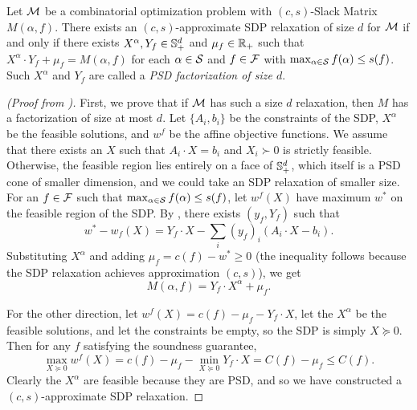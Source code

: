 \begin{theorem}\label{thm:yannakakis}
Let $\mathcal M$ be a combinatorial optimization problem with $(c,s)$-Slack Matrix $M(\alpha,f)$. There exists an $(c,s)$-approximate SDP relaxation of size $d$ for $\mathcal M$ if and only if there exists $X^\alpha,Y_f \in \mathbb{S}^{d}_+$ and $\mu_f \in \mathbb R_+$ such that $X^\alpha \cdot Y_f + \mu_f = M(\alpha,f)$ for each $\alpha \in \mathcal S $ and $f \in \mathcal F$ with $\max_{\alpha \in \mathcal S} f(\alpha) \leq s(f)$. Such $X^\alpha$ and $Y_f$ are called a \emph{PSD factorization of size $d$}.
\end{theorem}
\begin{proof}[(Proof from \cite{BPZ15})]
First, we prove that if $\mathcal M$ has such a size $d$ relaxation, then $M$ has a factorization of size at most $d$. Let $\{A_i, b_i\}$ be the constraints of the SDP, $X^\alpha$ be the feasible solutions, and $w^f$ be the affine objective functions. We assume that there exists an $X$ such that $A_i \cdot X = b_i$ and $X_i \succ 0$ is strictly feasible. Otherwise, the feasible region lies entirely on a face of $\mathbb{S}^{d}_+$, which itself is a PSD cone of smaller dimension, and we could take an SDP relaxation of smaller size. For an $f \in \mathcal F$ such that $\max_{\alpha \in \mathcal S} f(\alpha) \leq s(f)$, let $w^f(X)$ have maximum $w^*$ on the feasible region of the SDP. By , there exists $(y_f, Y_f)$ such that
\[w^* - w_f(X) = Y_f \cdot X - \sum_i (y_f)_i(A_i \cdot X - b_i).\]
Substituting $X^\alpha$ and adding $\mu_f = c(f) - w^* \geq 0$ (the inequality follows because the SDP relaxation achieves approximation $(c,s)$), we get
\[M(\alpha,f) = Y_f \cdot X^\alpha + \mu_f.\]

For the other direction, let $w^f(X) = c(f) - \mu_f - Y_f \cdot X$, let the $X^\alpha$ be the feasible solutions, and let the constraints be empty, so the SDP is simply $X \succeq 0$. Then for any $f$ satisfying the soundness guarantee,
\[\max_{X \succeq 0} w^f(X) = c(f) - \mu_f - \min_{X \succeq 0} Y_f \cdot X = C(f) - \mu_f \leq C(f).\]
Clearly the $X^\alpha$ are feasible because they are PSD, and so we have constructed a $(c,s)$-approximate SDP relaxation.
\end{proof}


